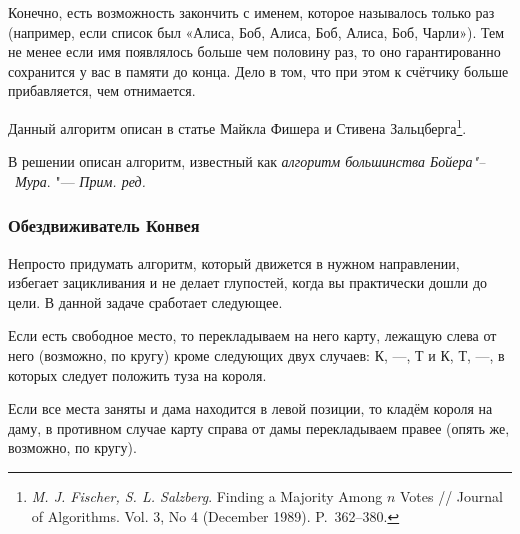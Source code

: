 \documentclass[twoside]{book}
\newenvironment{addedbytheeditors}{\par\medskip\small
}{\par\addvspace{\medskipamount}} %
\begin{document}
Конечно, есть возможность закончить с именем, которое называлось
только раз (например, если список был «Алиса, Боб, Алиса, Боб, Алиса,
Боб, Чарли»).
Тем не менее если имя появлялось больше чем половину
раз, то оно гарантированно сохранится у вас в памяти до конца.
Дело в
том, что при этом к счётчику больше прибавляется, чем отнимается.

Данный алгоритм описан в статье Майкла Фишера и Стивена
Зальцберга\footnote{\emph{M. J. Fischer, S. L. Salzberg}. Finding a Majority Among $n$ Votes /\!/ {Journal of Algorithms}. Vol. 3, No 4 (December 1989). P.~362--380.}.

\begin{addedbytheeditors}
В решении описан алгоритм, известный как \emph{алгоритм большинства Бойера"--~Мура}. "--- \emph{Прим. ред.}  
\end{addedbytheeditors}

\subsubsection*{Обездвиживатель Конвея}%

Непросто придумать алгоритм, который движется в нужном направлении,
избегает зацикливания и не делает глупостей, когда вы практически
дошли до цели.
В данной задаче сработает следующее.

\medskip

Если есть свободное место, то перекладываем на него карту, лежащую
слева от него (возможно, по кругу) кроме следующих двух случаев: К,
---, Т и К, Т, ---, в которых следует положить туза на короля.

Если все места заняты и дама находится в левой позиции, то кладём короля на даму, в противном случае карту справа от дамы перекладываем правее (опять же, возможно, по кругу).
\end{document}
